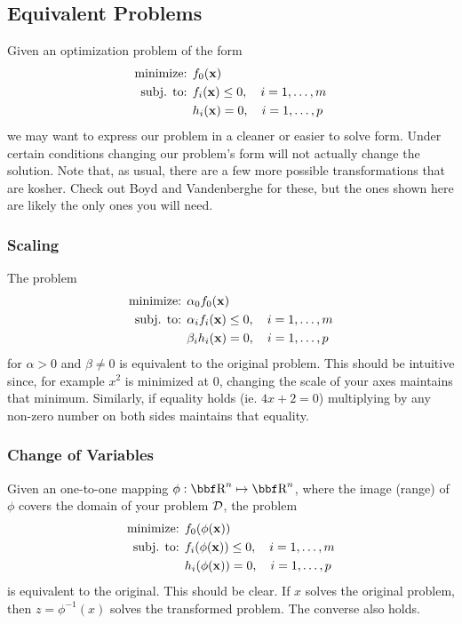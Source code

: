 \documentclass{article}
\begin{document}
\subsection{Equivalent Problems}

Given an optimization problem of the form
\begin{align*}
    \text{minimize: } & f_0({\bf x})\\
    \text{subj. to: } & f_i({\bf x}) \leq 0, \quad i=1,\dots,m\\
                      & h_i({\bf x}) = 0, \quad i=1,\dots,p
\end{align*}
we may want to express our problem in a cleaner or easier
to solve form. Under certain conditions changing our problem's
form will not actually change the solution. Note that, as usual,
there are a few more possible transformations that are kosher.
Check out Boyd and Vandenberghe for these, but the ones shown here
are likely the only ones you will need.

\subsubsection{Scaling}

The problem
\begin{align*}
    \text{minimize: } & \alpha_0f_0({\bf x})\\
    \text{subj. to: } & \alpha_if_i({\bf x}) \leq 0, \quad i=1,\dots,m\\
                      & \beta_ih_i({\bf x}) = 0, \quad i=1,\dots,p
\end{align*}
for $\alpha > 0$ and $\beta \neq 0$ is equivalent to the original
problem. This should be intuitive since, for example $x^2$ is minimized
at 0, changing the scale of your axes maintains that minimum. Similarly,
if equality holds (ie. $4x+2=0$) multiplying by any non-zero number on
both sides maintains that equality.

\subsubsection{Change of Variables}

Given an one-to-one mapping $\phi : \RR^n \mapsto \RR^n$, where the image
(range) of $\phi$ covers the domain of your problem ${\cal D}$, the problem
\begin{align*}
    \text{minimize: } & f_0(\phi({\bf x}))\\
    \text{subj. to: } & f_i(\phi({\bf x})) \leq 0, \quad i=1,\dots,m\\
                      & h_i(\phi({\bf x})) = 0, \quad i=1,\dots,p
\end{align*}
is equivalent to the original. This should be clear. If $x$ solves the
original problem, then $z = \phi^{-1}(x)$ solves the transformed problem.
The converse also holds.
\end{document}
